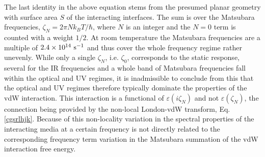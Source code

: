 \documentclass[letterpaper,twocolumn,amsmath,amssymb,floatfix,aps,superscriptaddress]{revtex4}
\begin{document}
The last identity in the above equation stems from the presumed planar geometry with  surface area  $S$ of the interacting interfaces.  The sum is over the Matsubara frequencies, $\zeta_N = 2\pi N k_BT/\hbar$, where $N$ is an integer and the $N=0$ term is counted with a weight $1/2$. At room temperature the Matsubara frequencies are a multiple of $\rm 2.4 \times 10^{14}~s^{-1}$ and thus cover the whole frequency regime rather unevenly. While only a single $\zeta_N$, i.e. $\zeta_0$,  corresponds to the static response, several for the IR frequencies and a whole band of Matsubara frequencies fall within the optical and UV regimes, it is inadmissible to conclude from this that the optical and UV regimes therefore typically dominate the properties of the vdW interaction. This interaction is a functional of $\varepsilon(i \zeta_N)$ and not $\varepsilon(\zeta_N)$, the connection being provided by the non-local London-vdW transform, Eq. \ref{cgsrlhjk}. Because of this non-locality variation in the spectral properties of the interacting media at a certain frequency is not directly related to the corresponding frequency term variation in the Matsubara summation of the vdW interaction free energy.

\end{document}
